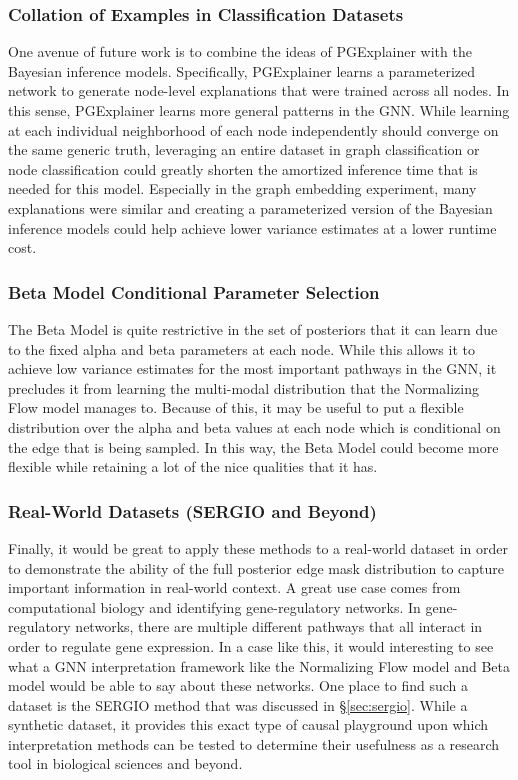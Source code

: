 \subsubsection{Collation of Examples in Classification Datasets}
One avenue of future work is to combine the ideas of PGExplainer \cite{luo_parameterized_2020} with the Bayesian inference models. Specifically, PGExplainer learns a parameterized network to generate node-level explanations that were trained across all nodes. In this sense, PGExplainer learns more general patterns in the GNN. While learning at each individual neighborhood of each node independently should converge on the same generic truth, leveraging an entire dataset in graph classification or node classification could greatly shorten the amortized inference time that is needed for this model. Especially in the graph embedding experiment, many explanations were similar and creating a parameterized version of the Bayesian inference models could help achieve lower variance estimates at a lower runtime cost.

\subsubsection{Beta Model Conditional Parameter Selection}
The Beta Model is quite restrictive in the set of posteriors that it can learn due to the fixed alpha and beta parameters at each node. While this allows it to achieve low variance estimates for the most important pathways in the GNN, it precludes it from learning the multi-modal distribution that the Normalizing Flow model manages to. Because of this, it may be useful to put a flexible distribution over the alpha and beta values at each node which is conditional on the edge that is being sampled. In this way, the Beta Model could become more flexible while retaining a lot of the nice qualities that it has. 

\subsubsection{Real-World Datasets (SERGIO and Beyond)}
Finally, it would be great to apply these methods to a real-world dataset in order to demonstrate the ability of the full posterior edge mask distribution to capture important information in real-world context. A great use case comes from computational biology and identifying gene-regulatory networks. In gene-regulatory networks, there are multiple different pathways that all interact in order to regulate gene expression. In a case like this, it would interesting to see what a GNN interpretation framework like the Normalizing Flow model and Beta model would be able to say about these networks. One place to find such a dataset is the SERGIO \cite{dibaeinia_sergio_2020} method that was discussed in \S\ref{sec:sergio}. While a synthetic dataset, it provides this exact type of causal playground upon which interpretation methods can be tested to determine their usefulness as a research tool in biological sciences and beyond.

\newpage
